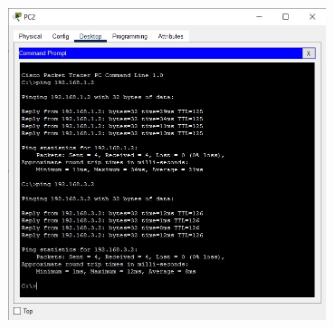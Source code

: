 \documentclass{article}
\begin{document}
\begin{figure}[H]
    \centering
    \includegraphics[width=0.75\textwidth]{figures/4.jpg}
    \caption{}
    \label{fig:fig1}
\end{figure}
\end{document}
